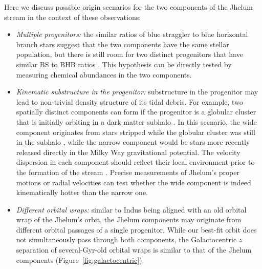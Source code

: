 \documentclass[twocolumn]{aastex62}
\begin{document}
Here we discuss possible origin scenarios for the two components of the Jhelum stream in the context of these observations:
\begin{itemize}
 \item{\emph{Multiple progenitors:} the similar ratios of blue straggler to blue horizontal branch stars suggest that the two components have the same stellar population, but there is still room for two distinct progenitors that have similar BS to BHB ratios \citep[e.g., a system of a low-mass globular cluster and a low-mass dwarf galaxy,][]{deason2015}.
 This hypothesis can be directly tested by measuring chemical abundances in the two components.
 }
 \item{\emph{Kinematic substructure in the progenitor:} substructure in the progenitor may lead to non-trivial density structure of its tidal debris.
 For example, two spatially distinct components can form if the progenitor is a globular cluster that is initially orbiting in a dark-matter subhalo \citep[e.g.,][]{penarrubia2017, carlberg2018}.
 In this scenario, the wide component originates from stars stripped while the globular cluster was still in the subhalo \citep[similar to the recently reported GD-1 cocoon,][]{malhan2019}, while the narrow component would be stars more recently released directly in the Milky Way gravitational potential.
 The velocity dispersion in each component should reflect their local environment prior to the formation of the stream \citep[e.g.,][]{fardal2015}.
 Precise measurements of Jhelum's proper motions or radial velocities can test whether the wide component is indeed kinematically hotter than the narrow one.
 }
 \item{\emph{Different orbital wraps:} similar to Indus being aligned with an old orbital wrap of the Jhelum's orbit, the Jhelum components may originate from different orbital passages of a single progenitor.
 While our best-fit orbit does not simultaneously pass through both components, the Galactocentric $z$ separation of several-Gyr-old orbital wraps is similar to that of the Jhelum components (Figure~\ref{fig:galactocentric}).
}
\end{itemize}
\end{document}
